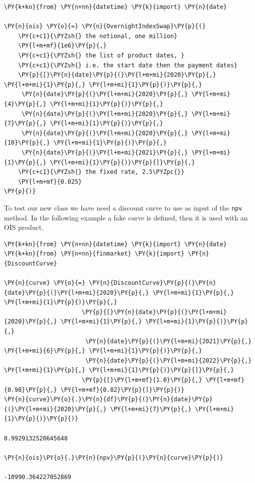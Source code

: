 \begin{Verbatim}[commandchars=\\\{\}]
\PY{k+kn}{from} \PY{n+nn}{datetime} \PY{k}{import} \PY{n}{date}

\PY{n}{ois} \PY{o}{=} \PY{n}{OvernightIndexSwap}\PY{p}{(}
    \PY{c+c1}{\PYZsh{} the notional, one million}
    \PY{l+m+mf}{1e6}\PY{p}{,}
    \PY{c+c1}{\PYZsh{} the list of product dates, }
    \PY{c+c1}{\PYZsh{} i.e. the start date then the payment dates}
    \PY{p}{[}\PY{n}{date}\PY{p}{(}\PY{l+m+mi}{2020}\PY{p}{,} \PY{l+m+mi}{1}\PY{p}{,} \PY{l+m+mi}{1}\PY{p}{)}\PY{p}{,} 
     \PY{n}{date}\PY{p}{(}\PY{l+m+mi}{2020}\PY{p}{,} \PY{l+m+mi}{4}\PY{p}{,} \PY{l+m+mi}{1}\PY{p}{)}\PY{p}{,} 
     \PY{n}{date}\PY{p}{(}\PY{l+m+mi}{2020}\PY{p}{,} \PY{l+m+mi}{7}\PY{p}{,} \PY{l+m+mi}{1}\PY{p}{)}\PY{p}{,} 
     \PY{n}{date}\PY{p}{(}\PY{l+m+mi}{2020}\PY{p}{,} \PY{l+m+mi}{10}\PY{p}{,} \PY{l+m+mi}{1}\PY{p}{)}\PY{p}{,}
     \PY{n}{date}\PY{p}{(}\PY{l+m+mi}{2021}\PY{p}{,} \PY{l+m+mi}{1}\PY{p}{,} \PY{l+m+mi}{1}\PY{p}{)}\PY{p}{]}\PY{p}{,}
    \PY{c+c1}{\PYZsh{} the fixed rate, 2.5\PYZpc{}}
    \PY{l+m+mf}{0.025}
\PY{p}{)}
\end{Verbatim}

To test our new class we have need a discount curve to use as input of the \texttt{npv} method. 
In the following example a fake curve is defined, then it is used with an OIS product.

\begin{Verbatim}[commandchars=\\\{\}]
\PY{k+kn}{from} \PY{n+nn}{datetime} \PY{k}{import} \PY{n}{date}
\PY{k+kn}{from} \PY{n+nn}{finmarket} \PY{k}{import} \PY{n}{DiscountCurve}
        
\PY{n}{curve} \PY{o}{=} \PY{n}{DiscountCurve}\PY{p}{(}\PY{n}{date}\PY{p}{(}\PY{l+m+mi}{2020}\PY{p}{,} \PY{l+m+mi}{1}\PY{p}{,} \PY{l+m+mi}{1}\PY{p}{)}\PY{p}{,}
                      \PY{p}{[}\PY{n}{date}\PY{p}{(}\PY{l+m+mi}{2020}\PY{p}{,} \PY{l+m+mi}{1}\PY{p}{,} \PY{l+m+mi}{1}\PY{p}{)}\PY{p}{,} 
                       \PY{n}{date}\PY{p}{(}\PY{l+m+mi}{2021}\PY{p}{,} \PY{l+m+mi}{6}\PY{p}{,} \PY{l+m+mi}{1}\PY{p}{)}\PY{p}{,} 
                       \PY{n}{date}\PY{p}{(}\PY{l+m+mi}{2022}\PY{p}{,} \PY{l+m+mi}{1}\PY{p}{,} \PY{l+m+mi}{1}\PY{p}{)}\PY{p}{]}\PY{p}{,}
                      \PY{p}{[}\PY{l+m+mf}{1.0}\PY{p}{,} \PY{l+m+mf}{0.98}\PY{p}{,} \PY{l+m+mf}{0.82}\PY{p}{]}\PY{p}{)}
\PY{n}{curve}\PY{o}{.}\PY{n}{df}\PY{p}{(}\PY{n}{date}\PY{p}{(}\PY{l+m+mi}{2020}\PY{p}{,} \PY{l+m+mi}{7}\PY{p}{,} \PY{l+m+mi}{1}\PY{p}{)}\PY{p}{)}

0.9929132520645648

\PY{n}{ois}\PY{o}{.}\PY{n}{npv}\PY{p}{(}\PY{n}{curve}\PY{p}{)}

-10990.364227052869
\end{Verbatim}
            
